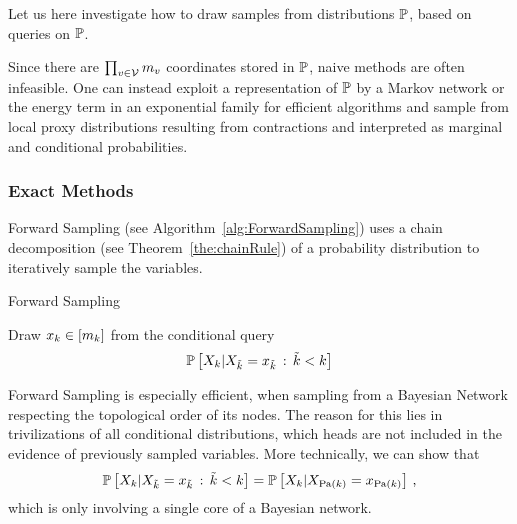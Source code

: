 Let us here investigate how to draw samples from distributions $\mathbb{P}$, based on queries on $\mathbb{P}$.

Since there are $\prod_{v\in\mathcal{V}}m_{v}$ coordinates stored in $\mathbb{P}$, naive methods are often infeasible.
One can instead exploit a representation of $\mathbb{P}$ by a Markov network or the energy term in an exponential family for efficient algorithms and sample from local proxy distributions resulting from contractions and interpreted as marginal and conditional probabilities.

\subsubsection{Exact Methods}

Forward Sampling (see Algorithm~\ref{alg:ForwardSampling}) uses a chain decomposition (see Theorem~\ref{the:chainRule}) of a probability distribution to iteratively sample the variables.

\begin{algorithm}[hbt!]
\caption{Forward Sampling}\label{alg:ForwardSampling}
\begin{algorithmic}
\For{$\catenumeratorin$}
	\State Draw $x_{k}\in[m_{k}]$ from the conditional query
		\[ \mathbb{P}\left[X_{k}|X_{\tilde{k}}=x_{\tilde{k}} \, : \, \tilde{k} < k\right] \]
\EndFor
\end{algorithmic}
\end{algorithm}

%
Forward Sampling is especially efficient, when sampling from a Bayesian Network respecting the topological order of its nodes.
The reason for this lies in trivilizations of all conditional distributions, which heads are not included in the evidence of previously sampled variables.
More technically, we can show that
	\[ \mathbb{P}\left[X_{k}|X_{\tilde{k}}=x_{\tilde{k}} \, : \, \tilde{k} < k\right]  
	= \mathbb{P}\left[X_{k}|X_{\mathrm{Pa}(k)}=x_{\mathrm{Pa}(k)}\right] \, , \]
which is only involving a single core of a Bayesian network.




